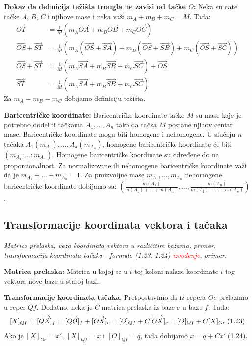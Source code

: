 \documentclass[12pt]{article}
\newcommand{\vek}[1]{\overrightarrow{#1}}
\newcommand{\ocena}[1]{\textcolor{red}{#1}}
\begin{document}
\textbf{Dokaz da definicija težišta trougla ne zavisi od tačke $O$:} Neka su
date tačke $A$, $B$, $C$ i njihove mase i neka važi $m_{A}+m_{B}+m_{C}=M$.
Tada:
\begin{align*}
    \vek{OT}          & =\frac{1}{M}(m_{A}\vek{OA}+m_{B}\vek{OB}
    +m_{C}\vek{OC})                                              \\
    \vek{OS}+\vek{ST} & =\frac{1}{M}(m_{A}(\vek{OS}+\vek{SA})
    +m_{B}(\vek{OS}+\vek{SB})+m_{C}(\vek{OS}+\vek{SC}))          \\
    \vek{OS}+\vek{ST} & =\frac{1}{M}(m_{A}\vek{SA}+m_{B}\vek{SB}
    +m_{C}\vek{SC})+\vek{OS}                                     \\
    \vek{ST}          & =\frac{1}{M}(m_{A}\vek{SA}+m_{B}\vek{SB}
    +m_{C}\vek{SC})
\end{align*}
Za $m_{A}=m_{B}=m_{C}$ dobijamo definiciju težišta.
\par

\textbf{Baricentričke koordinate:} Baricentričke koordinate tačke $M$ su mase
koje je potrebno dodeliti tačkama $A_1,\dotsc,A_n$ tako da tačka $M$ postane
njihov centar mase. Baricentričke koordinate mogu biti homogene i nehomogene.
U slučaju $n$ tačaka $A_1(m_{A_1}),\dotsc,A_n(m_{A_n})$, homogene
baricentričke koordinate će biti $(m_{A_1}:\dotsc:m_{A_n})$. Homogene
baricentričke koordinate su određene do na proporcionalnost. Za normalizovane
ili nehomogene baricentričke koordinate važi da je $m_{A_1}+\dotsc+m_{A_n}=1$.
Za proizvoljne mase $m_{A_1},\dotsc,m_{A_n}$ nehomogene baricentričke
koordinate dobijamo sa: $(\frac{m(A_1)}{m(A_1)+\dotsc+m(A_n)},\dotsc,
    \frac{m(A_n)}{m(A_1)+\dotsc+m(A_n)})$.

\subsection{Transformacije koordinata vektora i tačaka}
\textit{Matrica prelaska, veza koordinata vektora u različitim bazama,
    primer, transformacija koordinata tačaka - formule (1.23, 1.24)
    \ocena{izvođenje}, primer.}
\par
\vspace*{1cm}

\textbf{Matrica prelaska:} Matrica u kojoj se u $i$-toj koloni nalaze
koordinate $i$-tog vektora nove baze u staroj bazi.
\par

\textbf{Transformacije koordinata tačaka:} Pretpostavimo da iz repera $Oe$
prelazimo u reper $Qf$. Dodatno, neka je $C$ matrica prelaska iz baze $e$ u
bazu $f$. Tada:
$$[X]_{Qf}=[\vek{QX}]_f=[\vek{QO}]_f+[\vek{OX}]_e=[O]_{Qf}+C[\vek{OX}]_e
    =[O]_{Qf}+C[X]_{Oe}\hspace*{0.1cm}\text{(1.23)}$$
Ako je $[X]_{Oe}=x'$, $[X]_{Qf}=x$ i $[O]_{Qf}=q$, tada dobijamo $x=q+Cx'$
(1.24).
\end{document}
